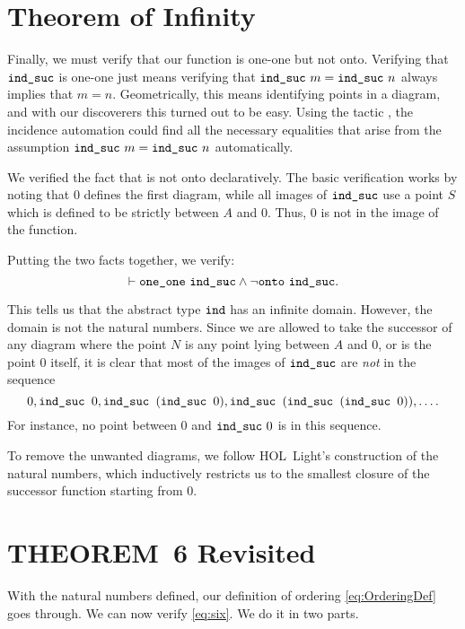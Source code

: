 \section{Theorem of Infinity}
Finally, we must verify that our function is one-one but not onto. Verifying that $\texttt{ind\_suc}$ is one-one just means verifying that $\texttt{ind\_suc}\ m = \texttt{ind\_suc}\ n$ always implies that \mbox{$m = n$}. Geometrically, this means identifying points in a diagram, and with our discoverers this turned out to be easy. Using the tactic , the incidence automation could find all the necessary equalities that arise from the assumption $\texttt{ind\_suc}\ m = \texttt{ind\_suc}\ n$ automatically.

We verified the fact that  is not onto declaratively. The basic verification works by noting that $0$ defines the first diagram, while all images of $\texttt{ind\_suc}$ use a point $S$ which is defined to be strictly between $A$ and $0$. Thus, $0$ is not in the image of the function. 

Putting the two facts together, we verify:
\begin{equation*}
\vdash\texttt{one\_one}\ \texttt{ind\_suc} \wedge \neg\texttt{onto}\ \texttt{ind\_suc}.
\end{equation*}

This tells us that the abstract type $\texttt{ind}$ has an infinite domain. However, the domain is not the natural numbers. Since we are allowed to take the successor of any diagram where the point $N$ is any point lying between $A$ and $0$, or is the point $0$ itself, it is clear that most of the images of $\texttt{ind\_suc}$ are \emph{not} in the sequence
\begin{displaymath}
0, \texttt{ind\_suc } 0, \texttt{ind\_suc }(\texttt{ind\_suc } 0), \texttt{ind\_suc }(\texttt{ind\_suc }(\texttt{ind\_suc } 0)),  \ldots.
\end{displaymath}
For instance, no point between $0$ and $\texttt{ind\_suc}\ 0$ is in this sequence.

To remove the unwanted diagrams, we follow HOL~Light's construction of the natural numbers, which inductively restricts us to the smallest closure of the successor function starting from $0$. 

\section{THEOREM~6 Revisited}
With the natural numbers defined, our definition of ordering \eqref{eq:OrderingDef} goes through. We can now verify \ref{eq:six}. We do it in two parts.

